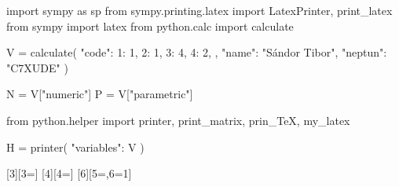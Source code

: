 \usepackage{pyluatex}

\begin{python}
import sympy as sp
from sympy.printing.latex import LatexPrinter, print_latex
from sympy import latex
from python.calc import calculate

V = calculate({
    "code": {
        1: 1, 
        2: 1,
        3: 4,
        4: 2,
    },
    "name": "Sándor Tibor",
    "neptun": "C7XUDE"
})

N = V["numeric"]
P = V["parametric"]

from python.helper import printer, print_matrix, prin_TeX, my_latex

H = printer({
    "variables": V
})
\end{python}

\usepackage{xargs}

\newcommand{\pv}[1]{\py{V["#1"]}}
\newcommand{\pvec}[2]{\py{V["#1"][#2]}}
\newcommand{\pmat}[3]{\py{V["#1"][#2, #3]}}

[3][3=]{}
[4][4=]{}
[6][5=,6=1]{}
